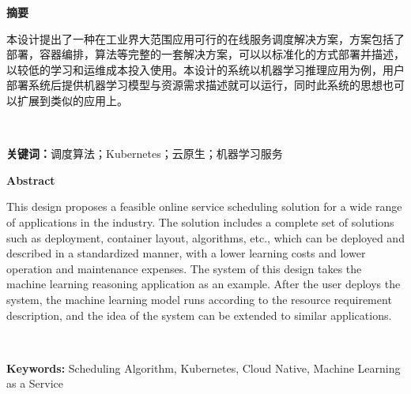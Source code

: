 \begin{center}
    \bfseries {} 摘要
\end{center}

本设计提出了一种在工业界大范围应用可行的在线服务调度解决方案，方案包括了部署，容器编排，算法等完整的一套解决方案，可以以标准化的方式部署并描述，以较低的学习和运维成本投入使用。本设计的系统以机器学习推理应用为例，用户部署系统后提供机器学习模型与资源需求描述就可以运行，同时此系统的思想也可以扩展到类似的应用上。

~\newline

\noindent\textbf{关键词：}调度算法；Kubernetes；云原生；机器学习服务

\begin{center}
    \bfseries {} Abstract
\end{center}

This design proposes a feasible online service scheduling solution for a wide range of applications in the industry. The solution includes a complete set of solutions such as deployment, container layout, algorithms, etc., which can be deployed and described in a standardized manner, with a lower learning costs and lower operation and maintenance expenses. The system of this design takes the machine learning reasoning application as an example. After the user deploys the system, the machine learning model runs according to the resource requirement description, and the idea of the system can be extended to similar applications.

~\newline

\noindent\textbf{Keywords:} Scheduling Algorithm, Kubernetes, Cloud Native, Machine Learning as a Service
